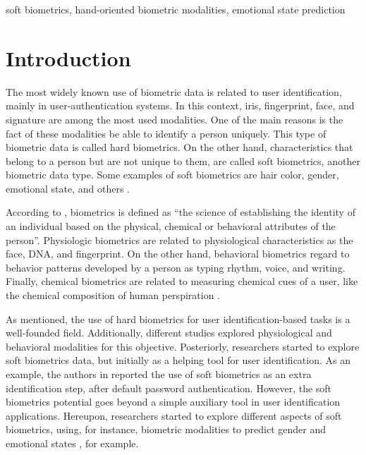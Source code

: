 \documentclass[conference]{IEEEtran}
\begin{document}
\begin{IEEEkeywords}
soft biometrics, hand-oriented biometric modalities,  emotional state prediction
\end{IEEEkeywords}

\section{Introduction}

The most widely known use of biometric data is related to user identification, mainly in user-authentication systems. In this context, iris, fingerprint, face, and signature are among the most used modalities. One of the main reasons is the fact of these modalities be able to identify a person uniquely. This type of biometric data is called hard biometrics. On the other hand, characteristics that belong to a person but are not unique to them, are called soft biometrics, another biometric data type. Some examples of soft biometrics are hair color, gender, emotional state, and others \cite{handbook-multibiometrics,marjory-emotion1}. 

According to \cite{handbook-biometrics}, biometrics is defined as ``the science of establishing the identity of an individual based on the physical, chemical or behavioral attributes of the person''.
Physiologic biometrics are related to physiological characteristics as the face, DNA, and fingerprint. On the other hand, behavioral biometrics regard to behavior patterns developed by a person as typing rhythm, voice, and writing. Finally, chemical biometrics are related to measuring chemical cues of a user, like the chemical composition of human perspiration \cite{chemical-biometric-example}. 

As mentioned, the use of hard biometrics for user identification-based tasks is a well-founded field. Additionally, different studies explored physiological and behavioral modalities for this objective. Posteriorly,  researchers started to explore soft biometrics data, but initially as a helping tool for user identification. As an example, the authors in \cite{continuous-auth} reported the use of soft biometrics as an extra identification step, after default password authentication. 
However, the soft biometrics potential goes beyond a simple auxiliary tool in user identification applications. Hereupon, researchers started to explore different aspects of soft biometrics, using, for instance, biometric modalities to predict gender \cite{hw-gender1, cheng-hw-gender} and emotional states \cite{cheng-emotional, ks-emotion1, cheng-hw-gender}, for example. 
\end{document}
